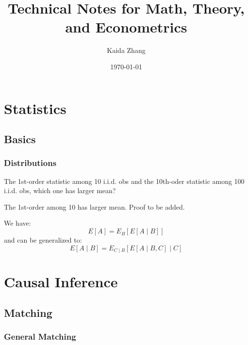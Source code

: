 

\title{Technical Notes for Math, Theory, and Econometrics}
\author{Kaida Zhang}
\date{\today}



\maketitle

\part{Statistics}

\chapter{Basics} %
\label{cha:basics}

\section{Distributions} %
\label{sec:distributions}


\begin{que}
    The 1st-order statistic among 10 i.i.d. obs and the 10th-oder statistic among 100 i.i.d. obs, which one has larger mean? 
\end{que}

\begin{answer}
    The 1st-order among 10 has larger mean. Proof to be added.
\end{answer}

\begin{thm}
    We have:
    \[E[A] = E_B[E[A \mid B]]\]
    and can be generalized to:
    \[E[A \mid B] = E_{C \mid B}[E[A \mid B,C] \mid C]\]
\end{thm}


\part{Causal Inference}
    
\chapter{Matching} %
\label{cha:matching}


\section{General Matching} %
\label{sec:general_matching}

